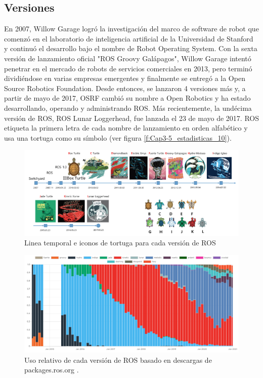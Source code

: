         \newpage

    \subsection{Versiones}
            En 2007, Willow Garage logró la investigación del marco de software de robot que comenzó en el laboratorio de inteligencia artificial de la Universidad de Stanford y continuó el desarrollo bajo el nombre de Robot Operating System. Con la sexta versión de lanzamiento oficial "ROS Groovy Galápagos", Willow Garage intentó penetrar en el mercado de robots de servicios comerciales en 2013, pero terminó dividiéndose en varias empresas emergentes y finalmente se entregó a la Open Source Robotics Foundation. Desde entonces, se lanzaron 4 versiones más y, a partir de mayo de 2017, OSRF cambió su nombre a Open Robotics y ha estado desarrollando, operando y administrando ROS. Más recientemente, la undécima versión de ROS, ROS Lunar Loggerhead, fue lanzada el 23 de mayo de 2017. ROS etiqueta la primera letra de cada nombre de lanzamiento en orden alfabético y usa una tortuga como su símbolo (ver figura \eqref{f:Cap3-5_estadisticas_10}).
            
            \begin{figure}[htb]
            \centering
            \includegraphics[width=0.94\linewidth]{Main/Chapter3/Images3/ver_ros_1.png}
            \caption{Linea temporal e iconos de tortuga para cada versión de ROS \cite{ROS_BOOK_1}}
            \label{f:Cap3-5_estadisticas_10}
            \end{figure} 
    
            \begin{figure}[htb]
            \centering
            \includegraphics[width=0.94\linewidth]{Main/Chapter3/Images3/ver_ros_2.png}
            \caption{Uso relativo de cada versión de ROS basado en descargas de packages.ros.org \cite{rosmetrics}.}            \label{f:Cap3-5_estadisticas_11}
            \end{figure} 
    
